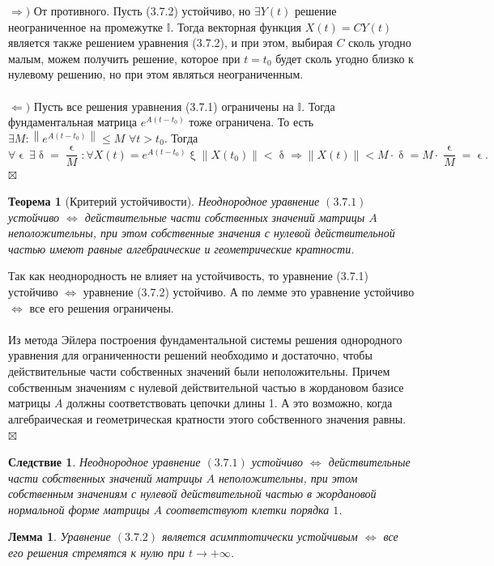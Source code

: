 \documentclass[a4paper, 12pt]{report}
\newenvironment{Proof} %
{\par\noindent{$\blacklozenge$}} %
{\hfill$\scriptstyle\boxtimes$}
\newcommand{\I}{\mathbb{I}}
\renewcommand{\leq}{\leqslant}
\renewcommand{\delta}{\updelta}
\renewcommand{\xi}{\upxi}
\renewcommand{\epsilon}{\upvarepsilon}
\newcommand\Norm[1]{\left\| #1 \right\|}
\newtheorem*{theorem}{Теорема}
\newtheorem*{cor}{Следствие}
\newtheorem*{lem}{Лемма}
\begin{document}
\begin{Proof}
	$\Rightarrow)$ От противного. Пусть (3.7.2) устойчиво, но $\exists Y(t)$ решение неограниченное на промежутке $\I$. Тогда векторная функция $X(t) = CY(t)$ является также решением уравнения (3.7.2), и при этом, выбирая $C$ сколь угодно малым, можем получить решение, которое при $t=t_0$ будет сколь угодно близко к нулевому решению, но при этом являться неограниченным.\\\\
	$\Leftarrow)$ Пусть все решения уравнения (3.7.1) ограничены на $\I$. Тогда фундаментальная матрица $e^{A(t-t_0)}$ тоже ограничена. То есть $\exists M : \Norm{e^{A(t-t_0)}}\leq M$ $\forall t > t_0$. Тогда $$\forall \epsilon\ \exists \delta = \dfrac{\epsilon}{M} : \forall X(t)=e^{A(t-t_0)}\xi \Norm{X(t_0)} < \delta \Rightarrow \Norm{X(t)} < M\cdot \delta = M\cdot \dfrac{\epsilon}{M} = \epsilon.$$
\end{Proof}
\begin{theorem}
	[Критерий устойчивости]
	Неоднородное уравнение $(3.7.1)$ устойчиво $\Longleftrightarrow$ действительные части собственных значений матрицы $A$ неположительны, при этом собственные значения с нулевой действительной частью имеют равные алгебраические и геометрические кратности.
\end{theorem}\begin{Proof}
Так как неоднородность не влияет на устойчивость, то уравнение (3.7.1) устойчиво $\Longleftrightarrow$ уравнение (3.7.2) устойчиво. А по лемме это уравнение устойчиво $\Longleftrightarrow$ все его решения ограничены.\\\\
Из метода Эйлера построения фундаментальной системы решения однородного уравнения для ограниченности решений необходимо и достаточно, чтобы действительные части собственных значений были неположительны. Причем собственным значениям с нулевой действительной частью в жордановом базисе матрицы $A$ должны соответствовать цепочки длины 1. А это возможно, когда алгебраическая и геометрическая кратности этого собственного значения равны.
\end{Proof}
\begin{cor}
	Неоднородное уравнение $(3.7.1)$ устойчиво $\Longleftrightarrow$ действительные части собственных значений матрицы $A$ неположительны, при этом собственным значениям с нулевой действительной частью в жордановой нормальной форме матрицы $A$ соответствуют клетки порядка $1$.
\end{cor}
\begin{lem}
	Уравнение $(3.7.2)$ является асимптотически устойчивым $\Longleftrightarrow$ все его решения стремятся к нулю при $t \rightarrow + \infty$.
\end{lem}
\end{document}

